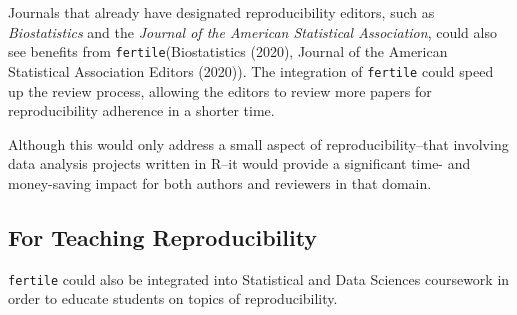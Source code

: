 \documentclass[12pt,twoside]{reedthesis}
\begin{document}
Journals that already have designated reproducibility editors, such as \emph{Biostatistics} and the \emph{Journal of the American Statistical Association}, could also see benefits from \texttt{fertile}(Biostatistics (2020), Journal of the American Statistical Association Editors (2020)). The integration of \texttt{fertile} could speed up the review process, allowing the editors to review more papers for reproducibility adherence in a shorter time.

Although this would only address a small aspect of reproducibility--that involving data analysis projects written in R--it would provide a significant time- and money-saving impact for both authors and reviewers in that domain.

\hypertarget{for-teaching-reproducibility}{%
\subsection{For Teaching Reproducibility}\label{for-teaching-reproducibility}}

\texttt{fertile} could also be integrated into Statistical and Data Sciences coursework in order to educate students on topics of reproducibility.
\end{document}

